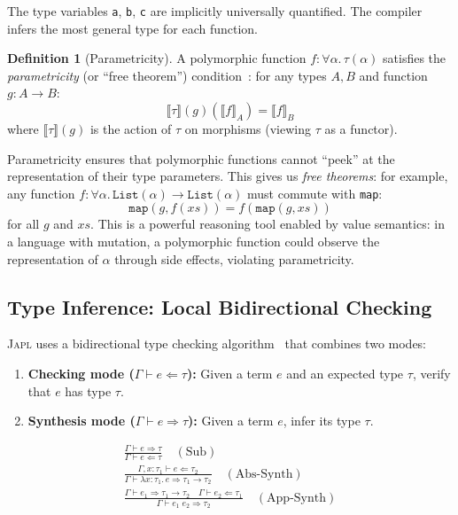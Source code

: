 \documentclass[11pt]{article}
\theoremstyle{definition}
\newtheorem{definition}[theorem]{Definition}
\theoremstyle{remark}
\newcommand{\sem}[1]{\llbracket #1 \rrbracket}
\newcommand{\japl}{\textsc{Japl}}
\begin{document}
The type variables \texttt{a}, \texttt{b}, \texttt{c} are implicitly
universally quantified.  The compiler infers the most general type
for each function.

\begin{definition}[Parametricity]
\label{def:parametricity}
A polymorphic function $f : \forall \alpha.\, \tau(\alpha)$ satisfies
the \emph{parametricity} (or ``free theorem'')
condition~\cite{wadler1989theorems}: for any types $A, B$ and
function $g : A \to B$:
\[
  \sem{\tau}(g)(\sem{f}_A) = \sem{f}_B
\]
where $\sem{\tau}(g)$ is the action of $\tau$ on morphisms (viewing
$\tau$ as a functor).
\end{definition}

Parametricity ensures that polymorphic functions cannot ``peek'' at the
representation of their type parameters.  This gives us
\emph{free theorems}: for example, any function $f : \forall \alpha.\,
\texttt{List}(\alpha) \to \texttt{List}(\alpha)$ must commute with
\texttt{map}:
\[
  \texttt{map}(g, f(xs)) = f(\texttt{map}(g, xs))
\]
for all $g$ and $xs$.  This is a powerful reasoning tool enabled by
value semantics: in a language with mutation, a polymorphic function
could observe the representation of $\alpha$ through side effects,
violating parametricity.

\subsection{Type Inference: Local Bidirectional Checking}
\label{sec:type-system:inference}

\japl{} uses a bidirectional type checking
algorithm~\cite{pierce2000local,dunfield2021bidirectional} that
combines two modes:

\begin{enumerate}
  \item \textbf{Checking mode ($\Gamma \vdash e \Leftarrow \tau$):}
    Given a term $e$ and an expected type $\tau$, verify that $e$
    has type $\tau$.
  \item \textbf{Synthesis mode ($\Gamma \vdash e \Rightarrow \tau$):}
    Given a term $e$, infer its type $\tau$.
\end{enumerate}

\begin{gather}
  \frac{\Gamma \vdash e \Rightarrow \tau}
       {\Gamma \vdash e \Leftarrow \tau}
  \quad (\text{Sub})
  \\[8pt]
  \frac{\Gamma, x:\tau_1 \vdash e \Leftarrow \tau_2}
       {\Gamma \vdash \lambda x:\tau_1.\, e \Rightarrow \tau_1 \to \tau_2}
  \quad (\text{Abs-Synth})
  \\[8pt]
  \frac{\Gamma \vdash e_1 \Rightarrow \tau_1 \to \tau_2 \quad
        \Gamma \vdash e_2 \Leftarrow \tau_1}
       {\Gamma \vdash e_1\; e_2 \Rightarrow \tau_2}
  \quad (\text{App-Synth})
\end{gather}
\end{document}
